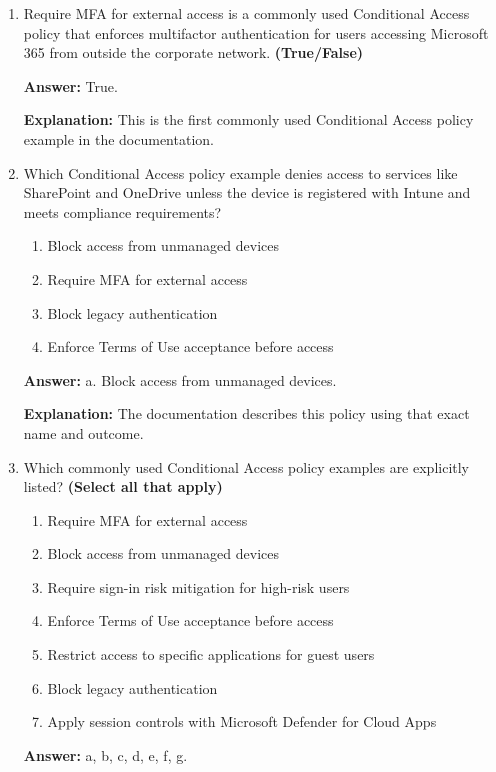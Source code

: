 \documentclass[10pt]{article}
\begin{document}
\begin{enumerate}[leftmargin=*]
\textbf{Explanation:} The documentation describes restricting downloads, restricting data copying, and using session context with Defender for Cloud Apps.

\item Require MFA for external access is a commonly used Conditional Access policy that enforces multifactor authentication for users accessing Microsoft 365 from outside the corporate network. \textbf{(True/False)}

\textbf{Answer:} True.

\textbf{Explanation:} This is the first commonly used Conditional Access policy example in the documentation.

\item Which Conditional Access policy example denies access to services like SharePoint and OneDrive unless the device is registered with Intune and meets compliance requirements?
\begin{enumerate}[label=\alph*., leftmargin=1.5em]
\item Block access from unmanaged devices
\item Require MFA for external access
\item Block legacy authentication
\item Enforce Terms of Use acceptance before access
\end{enumerate}
\textbf{Answer:} a. Block access from unmanaged devices.

\textbf{Explanation:} The documentation describes this policy using that exact name and outcome.

\item Which commonly used Conditional Access policy examples are explicitly listed? \textbf{(Select all that apply)}
\begin{enumerate}[label=\alph*., leftmargin=1.5em]
\item Require MFA for external access
\item Block access from unmanaged devices
\item Require sign-in risk mitigation for high-risk users
\item Enforce Terms of Use acceptance before access
\item Restrict access to specific applications for guest users
\item Block legacy authentication
\item Apply session controls with Microsoft Defender for Cloud Apps
\end{enumerate}
\textbf{Answer:} a, b, c, d, e, f, g.


\end{enumerate}
\end{document}
